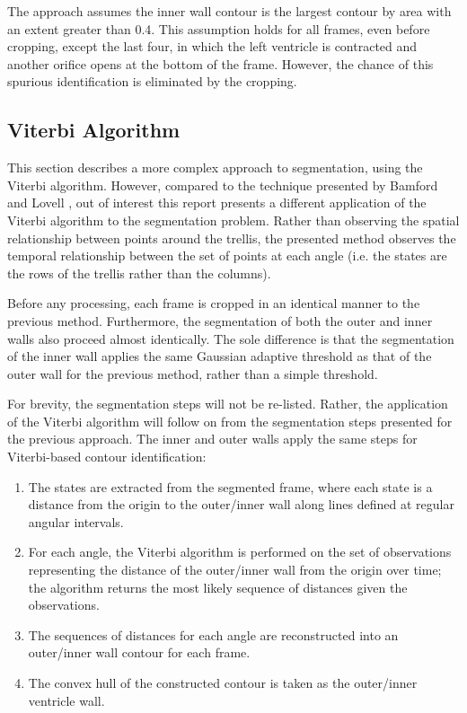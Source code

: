 The approach assumes the inner wall contour is the largest contour by area with an extent greater than 0.4. This assumption holds for all frames, even before cropping, except the last four, in which the left ventricle is contracted and another orifice opens at the bottom of the frame. However, the chance of this spurious identification is eliminated by the cropping.

\newpage
\subsection{Viterbi Algorithm}

This section describes a more complex approach to segmentation, using the Viterbi algorithm. However, compared to the technique presented by Bamford and Lovell \cite{bamford_1998}, out of interest this report presents a different application of the Viterbi algorithm to the segmentation problem. Rather than observing the spatial relationship between points around the trellis, the presented method observes the temporal relationship between the set of points at each angle (i.e. the states are the rows of the trellis rather than the columns).

Before any processing, each frame is cropped in an identical manner to the previous method. Furthermore, the segmentation of both the outer and inner walls also proceed almost identically. The sole difference is that the segmentation of the inner wall applies the same Gaussian adaptive threshold as that of the outer wall for the previous method, rather than a simple threshold.

For brevity, the segmentation steps will not be re-listed. Rather, the application of the Viterbi algorithm will follow on from the segmentation steps presented for the previous approach. The inner and outer walls apply the same steps for Viterbi-based contour identification:

\begin{enumerate}
  \item The states are extracted from the segmented frame, where each state is a distance from the origin to the outer/inner wall along lines defined at regular angular intervals.

  \item For each angle, the Viterbi algorithm is performed on the set of observations representing the distance of the outer/inner wall from the origin over time; the algorithm returns the most likely sequence of distances given the observations.

  \item The sequences of distances for each angle are reconstructed into an outer/inner wall contour for each frame.

  \item The convex hull of the constructed contour is taken as the outer/inner ventricle wall.

\end{enumerate}

